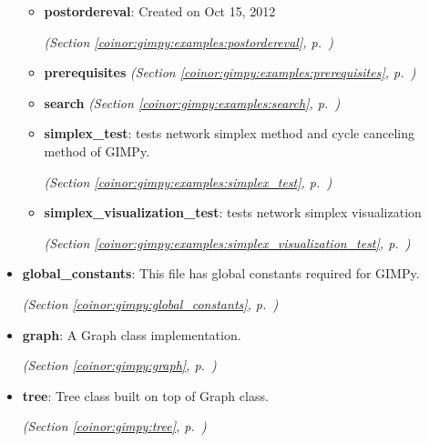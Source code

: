 \begin{itemize}
\begin{itemize}
    \item \textbf{postordereval}: Created on Oct 15, 2012



  \textit{(Section \ref{coinor:gimpy:examples:postordereval}, p.~\pageref{coinor:gimpy:examples:postordereval})}

    \item \textbf{prerequisites}
  \textit{(Section \ref{coinor:gimpy:examples:prerequisites}, p.~\pageref{coinor:gimpy:examples:prerequisites})}

    \item \textbf{search}
  \textit{(Section \ref{coinor:gimpy:examples:search}, p.~\pageref{coinor:gimpy:examples:search})}

    \item \textbf{simplex\_test}: tests network simplex method and cycle canceling method of GIMPy.



  \textit{(Section \ref{coinor:gimpy:examples:simplex_test}, p.~\pageref{coinor:gimpy:examples:simplex_test})}

    \item \textbf{simplex\_visualization\_test}: tests network simplex visualization



  \textit{(Section \ref{coinor:gimpy:examples:simplex_visualization_test}, p.~\pageref{coinor:gimpy:examples:simplex_visualization_test})}

  \end{itemize}
\item \textbf{global\_constants}: This file has global constants required for GIMPy.



  \textit{(Section \ref{coinor:gimpy:global_constants}, p.~\pageref{coinor:gimpy:global_constants})}

\item \textbf{graph}: 
A Graph class implementation. 


  \textit{(Section \ref{coinor:gimpy:graph}, p.~\pageref{coinor:gimpy:graph})}

\item \textbf{tree}: Tree class built on top of Graph class.



  \textit{(Section \ref{coinor:gimpy:tree}, p.~\pageref{coinor:gimpy:tree})}

\end{itemize}



